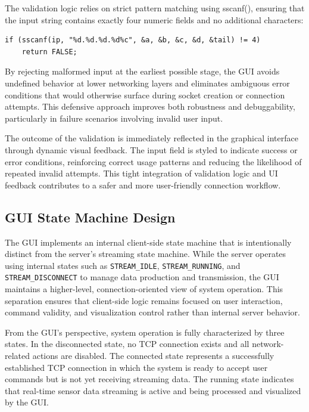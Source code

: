 The validation logic relies on strict pattern matching using sscanf(), ensuring that the input string contains exactly four numeric fields and no additional characters:
\begin{verbatim}
if (sscanf(ip, "%d.%d.%d.%d%c", &a, &b, &c, &d, &tail) != 4)
    return FALSE;
\end{verbatim}

By rejecting malformed input at the earliest possible stage, the GUI avoids undefined behavior at lower networking layers and eliminates ambiguous error conditions that would otherwise surface during socket creation or connection attempts. This defensive approach improves both robustness and debuggability, particularly in failure scenarios involving invalid user input.

The outcome of the validation is immediately reflected in the graphical interface through dynamic visual feedback. The input field is styled to indicate success or error conditions, reinforcing correct usage patterns and reducing the likelihood of repeated invalid attempts. This tight integration of validation logic and UI feedback contributes to a safer and more user-friendly connection workflow.

\subsection{GUI State Machine Design}
The GUI implements an internal client-side state machine that is intentionally
distinct from the server's streaming state machine. While the server operates
using internal states such as \texttt{STREAM\_IDLE}, \texttt{STREAM\_RUNNING},
and \texttt{STREAM\_DISCONNECT} to manage data production and transmission,
the GUI maintains a higher-level, connection-oriented view of system
operation. This separation ensures that client-side logic remains focused on
user interaction, command validity, and visualization control rather than
internal server behavior.

From the GUI's perspective, system operation is fully characterized by three
states. In the disconnected state, no TCP connection exists and all
network-related actions are disabled. The connected state represents a
successfully established TCP connection in which the system is ready to accept
user commands but is not yet receiving streaming data. The running state
indicates that real-time sensor data streaming is active and being processed
and visualized by the GUI.


